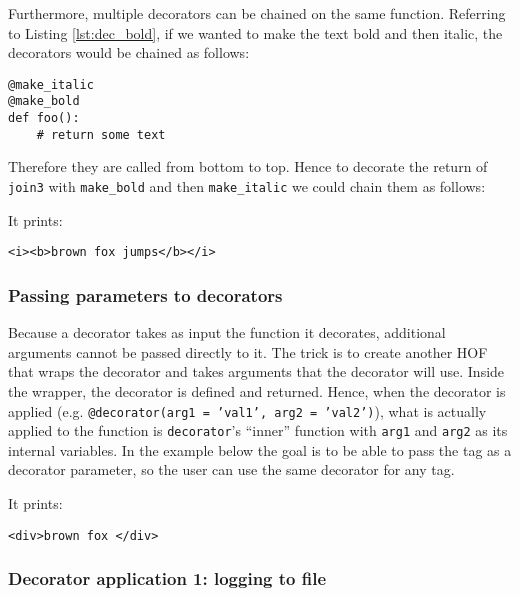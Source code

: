 \documentclass[a4paper]{article}
\begin{document}
Furthermore, multiple decorators can be chained on the same function. Referring to Listing \ref{lst:dec_bold}, if we wanted to make the text bold and then italic, the decorators would be chained as follows:
\begin{verbatim}
@make_italic
@make_bold
def foo():
    # return some text
\end{verbatim}
Therefore they are called from bottom to top. Hence to decorate the return of \texttt{join3} with \texttt{make\_bold} and then \texttt{make\_italic} we could chain them as follows:

It prints:
\begin{verbatim}
<i><b>brown fox jumps</b></i>
\end{verbatim}


\subsubsection{Passing parameters to decorators}

Because a decorator takes as input the function it decorates, additional arguments cannot be passed directly to it. The trick is to create another HOF that wraps the decorator and takes arguments that the decorator will use. Inside the wrapper, the decorator is defined and returned. Hence, when the decorator is applied (e.g. \texttt{@decorator(arg1 = 'val1', arg2 = 'val2')}), what is actually applied to the function is \texttt{decorator}'s ``inner'' function with \texttt{arg1} and \texttt{arg2} as its internal variables. In the example below the goal is to be able to pass the tag as a decorator parameter, so the user can use the same decorator for any tag.


It prints:
\begin{verbatim}
<div>brown fox </div>
\end{verbatim}

\subsubsection{Decorator application 1: logging to file}
\end{document}
